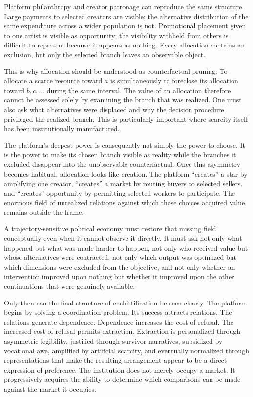 \documentclass[11pt]{article}
\begin{document}
Platform philanthropy and creator patronage can reproduce the same structure. Large payments to selected creators are visible; the alternative distribution of the same expenditure across a wider population is not. Promotional placement given to one artist is visible as opportunity; the visibility withheld from others is difficult to represent because it appears as nothing. Every allocation contains an exclusion, but only the selected branch leaves an observable object.

This is why allocation should be understood as counterfactual pruning. To allocate a scarce resource toward \(a\) is simultaneously to foreclose its allocation toward \(b,c,\ldots\) during the same interval. The value of an allocation therefore cannot be assessed solely by examining the branch that was realized. One must also ask what alternatives were displaced and why the decision procedure privileged the realized branch. This is particularly important where scarcity itself has been institutionally manufactured.

The platform's deepest power is consequently not simply the power to choose. It is the power to make its chosen branch visible as reality while the branches it excluded disappear into the unobservable counterfactual. Once this asymmetry becomes habitual, allocation looks like creation. The platform ``creates'' a star by amplifying one creator, ``creates'' a market by routing buyers to selected sellers, and ``creates'' opportunity by permitting selected workers to participate. The enormous field of unrealized relations against which those choices acquired value remains outside the frame.

A trajectory-sensitive political economy must restore that missing field conceptually even when it cannot observe it directly. It must ask not only what happened but what was made harder to happen, not only who received value but whose alternatives were contracted, not only which output was optimized but which dimensions were excluded from the objective, and not only whether an intervention improved upon nothing but whether it improved upon the other continuations that were genuinely available.

Only then can the final structure of enshittification be seen clearly. The platform begins by solving a coordination problem. Its success attracts relations. The relations generate dependence. Dependence increases the cost of refusal. The increased cost of refusal permits extraction. Extraction is personalized through asymmetric legibility, justified through survivor narratives, subsidized by vocational awe, amplified by artificial scarcity, and eventually normalized through representations that make the resulting arrangement appear to be a direct expression of preference. The institution does not merely occupy a market. It progressively acquires the ability to determine which comparisons can be made against the market it occupies.
\end{document}
